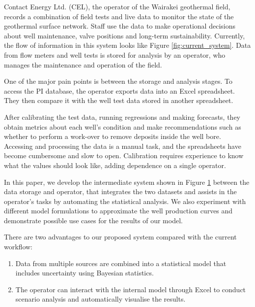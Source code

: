 \documentclass[a4paper, 12pt]{article}
\begin{document}
\begin{figure}
\begin{minipage}[t]{.48\textwidth}
  \label{fig:proposed_system}
\end{minipage}
\end{figure}

Contact Energy Ltd. (CEL), the operator of the Wairakei geothermal field, records a combination of field tests and live data to monitor the state of the geothermal surface network. Staff use the data to make operational decisions about well maintenance, valve positions and long-term sustainability. Currently, the flow of information in this system looks like Figure \ref{fig:current_system}. Data from flow meters and well tests is stored for analysis by an operator, who manages the maintenance and operation of the field. 

One of the major pain points is between the storage and analysis stages. To access the PI database, the operator exports data into an Excel spreadsheet. They then compare it with the well test data stored in another spreadsheet.

After calibrating the test data, running regressions and making forecasts, they obtain metrics about each well's condition and make recommendations such as whether to perform a work-over to remove deposits inside the well bore. Accessing and processing the data is a manual task, and the spreadsheets have become cumbersome and slow to open. Calibration requires experience to know what the values should look like, adding dependence on a single operator.

In this paper, we develop the intermediate system shown in Figure \ref{fig:proposed_system} between the data storage and operator, that integrates the two datasets and assists in the operator's tasks by automating the statistical analysis. We also experiment with different model formulations to approximate the well production curves and demonstrate possible use cases for the results of our model.

There are two advantages to our proposed system compared with the current workflow:
\begin{enumerate}
\item Data from multiple sources are combined into a statistical model that includes uncertainty using Bayesian statistics.
\item The operator can interact with the internal model through Excel to conduct scenario analysis and automatically visualise the results.
\end{enumerate}
\end{document}
